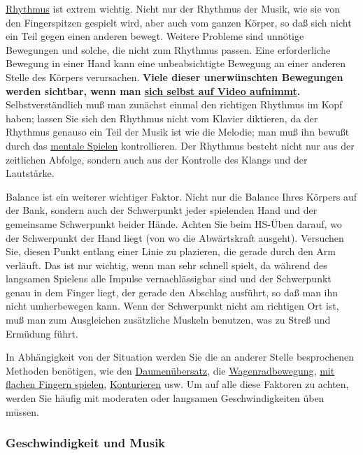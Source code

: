 \hyperref[c1iii1b]{Rhythmus} ist extrem wichtig.
Nicht nur der Rhythmus der Musik, wie sie von den Fingerspitzen gespielt wird, aber auch vom ganzen Körper, so daß sich nicht ein Teil gegen einen anderen bewegt.
Weitere Probleme sind unnötige Bewegungen und solche, die nicht zum Rhythmus passen.
Eine erforderliche Bewegung in einer Hand kann eine unbeabsichtigte Bewegung an einer anderen Stelle des Körpers verursachen.
\textbf{Viele dieser unerwünschten Bewegungen werden sichtbar, wenn man \hyperref[c1iii13]{sich selbst auf Video aufnimmt}.}
Selbstverständlich muß man zunächst einmal den richtigen Rhythmus im Kopf haben; lassen Sie sich den Rhythmus nicht vom Klavier diktieren, da der Rhythmus genauso ein Teil der Musik ist wie die Melodie; man muß ihn bewußt durch das \hyperref[c1ii12]{mentale Spielen} kontrollieren.
Der Rhythmus besteht nicht nur aus der zeitlichen Abfolge, sondern auch aus der Kontrolle des Klangs und der Lautstärke.

Balance ist ein weiterer wichtiger Faktor.
Nicht nur die Balance Ihres Körpers auf der Bank, sondern auch der Schwerpunkt jeder spielenden Hand und der gemeinsame Schwerpunkt beider Hände.
Achten Sie beim HS-Üben darauf, wo der Schwerpunkt der Hand liegt (von wo die Abwärtskraft ausgeht).
Versuchen Sie, diesen Punkt entlang einer Linie zu plazieren, die gerade durch den Arm verläuft.
Das ist nur wichtig, wenn man sehr schnell spielt, da während des langsamen Spielens alle Impulse vernachlässigbar sind und der Schwerpunkt genau in dem Finger liegt, der gerade den Abschlag ausführt, so daß man ihn nicht umherbewegen kann.
Wenn der Schwerpunkt nicht am richtigen Ort ist, muß man zum Ausgleichen zusätzliche Muskeln benutzen, was zu Streß und Ermüdung führt.

In Abhängigkeit von der Situation werden Sie die an anderer Stelle besprochenen Methoden benötigen, wie den \hyperref[c1iii5b]{Daumenübersatz}, die \hyperref[c1iii5wagen]{Wagenradbewegung}, \hyperref[c1iii4b]{mit flachen Fingern spielen}, \hyperref[c1iii8]{Konturieren} usw.
Um auf alle diese Faktoren zu achten, werden Sie häufig mit moderaten oder langsamen Geschwindigkeiten üben müssen.


\subsubsection{Geschwindigkeit und Musik}
\label{c1iii7iMusik}


